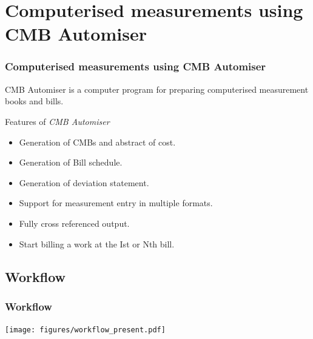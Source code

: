 \documentclass{beamer}
\begin{document}
\section{Computerised measurements using CMB Automiser}
\begin{frame}
  \frametitle{Computerised measurements using CMB Automiser}
  \begin{block}{}
    \alert{CMB Automiser} is a computer program for preparing computerised measurement books and bills.
  \end{block}
  \pause
  \begin{block}{Features of \emph{CMB Automiser}}
    \begin{itemize}[<+->]
      \pause
      \item Generation of CMBs and abstract of cost.
      \item Generation of Bill schedule.
      \item Generation of deviation statement.
      \item Support for measurement entry in multiple formats.
      \item Fully cross referenced output.
      \item Start billing a work at the Ist or Nth bill.
    \end{itemize}
  \end{block}
\end{frame}

\subsection{Workflow}
\begin{frame}
  \frametitle{Workflow}
  \centering
  \texttt{[image: figures/workflow\_present.pdf]}
\end{frame}
\end{document}
